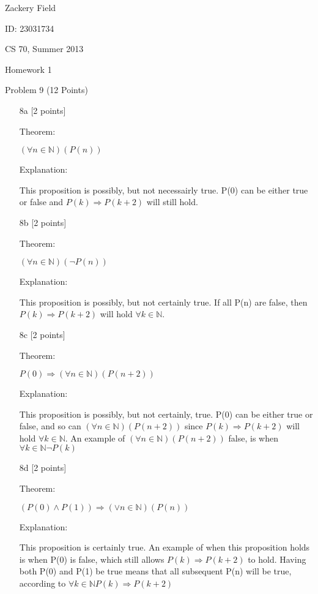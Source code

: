 \documentclass[11pt,letterpaper]{article}
\begin{document}
Zackery Field

ID: 23031734

CS 70, Summer 2013

Homework 1 

Problem 9 (12 Points)
\bigskip

\begin{enumerate}

\item[8a] [2 points] 

Theorem:

$(\forall n \in \mathbb{N})(P(n))$

Explanation:

This proposition is possibly, but not necessairly true. P(0) can be either true or false and $P(k) \Rightarrow P(k+2)$ will still hold.

\item[8b] [2 points]

Theorem:

$(\forall n \in \mathbb{N})(\neg P(n))$

Explanation:

This proposition is possibly, but not certainly true. If all P(n) are false, then $P(k) \Rightarrow P(k+2)$ will hold $\forall k \in \mathbb{N}$.

\item[8c] [2 points]

Theorem:

$ P(0) \Rightarrow (\forall n \in \mathbb{N})(P(n+2))$

Explanation:

This proposition is possibly, but not certainly, true. P(0) can be either true or false, and so can $(\forall n \in \mathbb{N})(P(n+2))$  since $P(k) \Rightarrow P(k+2)$ will hold $\forall k \in \mathbb{N}$. An example of  $(\forall n \in \mathbb{N})(P(n+2))$ false, is when $ \forall k \in \mathbb{N} \neg P(k) $

\item[8d] [2 points]

Theorem:

$(P(0) \wedge P(1)) \Rightarrow (\vee n \in \mathbb{N})(P(n))$

Explanation:

This proposition is certainly true. An example of when this proposition holds is when P(0) is false, which still allows  $P(k) \Rightarrow P(k+2)$ to hold. Having both P(0) and P(1) be true means that all subsequent P(n) will be true, according to $\forall k \in \mathbb{N} P(k) \Rightarrow P(k+2)$ 


\end{enumerate}
\end{document}
